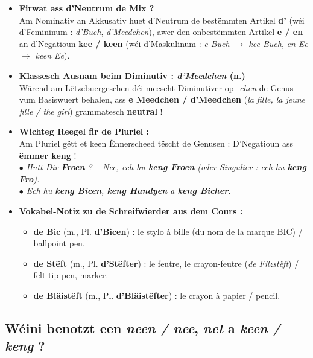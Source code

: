 \begin{itemize}
    \item \textbf{Firwat ass d'Neutrum \flqq de Mix\frqq{} ?} \\
    Am Nominativ an Akkusativ huet d'Neutrum de bestëmmten Artikel \textbf{d'} (wéi d'Femininum : \textit{d'Buch}, \textit{d'Meedchen}), awer den onbestëmmten Artikel \textbf{e / en} an d'Negatioun \textbf{kee / keen} (wéi d'Maskulinum : \textit{e Buch $\rightarrow$ kee Buch}, \textit{en Ee $\rightarrow$ keen Ee}).
    \item \textbf{Klassesch Ausnam beim Diminutiv : \textit{d'Meedchen} (n.)} \\
    Wärend am Lëtzebuergeschen déi meescht Diminutiver op \textit{-chen} de Genus vum Basiswuert behalen, ass \textbf{e Meedchen / d'Meedchen} (\textit{la fille, la jeune fille / the girl}) grammatesch \textbf{neutral} !
    \item \textbf{Wichteg Reegel fir de Pluriel :} \\
    Am Pluriel gëtt et keen Ënnerscheed tëscht de Genusen : D'Negatioun ass \textbf{ëmmer keng} ! \\
    $\bullet$ \textit{Hutt Dir \textbf{Froen} ? -- Nee, ech hu \textbf{keng Froen} (oder Singulier : ech hu \textbf{keng Fro}).} \\
    $\bullet$ \textit{Ech hu \textbf{keng Bicen}, \textbf{keng Handyen} a \textbf{keng Bicher}.}
    \item \textbf{Vokabel-Notiz zu de Schreifwierder aus dem Cours :}
    \begin{itemize}
        \item \textbf{de Bic} (m., Pl. \textbf{d'Bicen}) : le stylo à bille (du nom de la marque BIC) / ballpoint pen.
        \item \textbf{de Stëft} (m., Pl. \textbf{d'Stëfter}) : le feutre, le crayon-feutre (\textit{de Filzstëft}) / felt-tip pen, marker.
        \item \textbf{de Bläistëft} (m., Pl. \textbf{d'Bläistëfter}) : le crayon à papier / pencil.
    \end{itemize}
\end{itemize}

\subsection{Wéini benotzt een \textit{neen / nee}, \textit{net} a \textit{keen / keng} ?}

